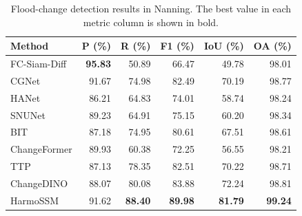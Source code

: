 \begingroup
\begin{table}[H]
\centering
\comparisonfont
\captionsetup{name=Table,font=comparisoncaption,labelfont=bf,labelsep=newline,justification=raggedright,singlelinecheck=false}
\caption{Flood-change detection results in Nanning. The best value in each metric column is shown in bold.}
\label{tab:comparison_guangxi}
\fontsize{10}{12}\selectfont
\setlength{\tabcolsep}{6pt}
\renewcommand{\arraystretch}{1.15}
\begin{tabular*}{\linewidth}{@{\extracolsep{\fill}}lrrrrr@{}}
\toprule
Method & P (\%) & R (\%) & F1 (\%) & IoU (\%) & OA (\%) \\
\midrule
FC-Siam-Diff & \textbf{95.83} & 50.89 & 66.47 & 49.78 & 98.01 \\
CGNet & 91.67 & 74.98 & 82.49 & 70.19 & 98.77 \\
HANet & 86.21 & 64.83 & 74.01 & 58.74 & 98.24 \\
SNUNet & 89.23 & 64.91 & 75.15 & 60.20 & 98.34 \\
BIT & 87.18 & 74.95 & 80.61 & 67.51 & 98.61 \\
ChangeFormer & 89.93 & 60.38 & 72.25 & 56.55 & 98.21 \\
TTP & 87.13 & 78.35 & 82.51 & 70.22 & 98.71 \\
ChangeDINO & 88.07 & 80.08 & 83.88 & 72.24 & 98.81 \\
HarmoSSM & 91.62 & \textbf{88.40} & \textbf{89.98} & \textbf{81.79} & \textbf{99.24} \\
\bottomrule
\end{tabular*}
\end{table}
\endgroup
